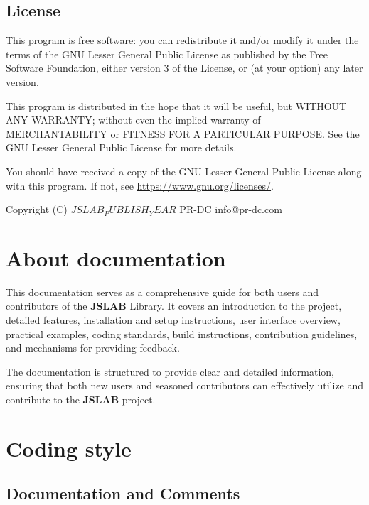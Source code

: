 \documentclass[12pt,a4paper]{article}
\newcommand{\yearvar}{$JSLAB_PUBLISH_YEAR$}
\begin{document}
\subsection{License}
This program is free software: you can redistribute it and/or modify it under the terms of the GNU Lesser General Public License as published by the Free Software Foundation, either version 3 of the License, or (at your option) any later version.

This program is distributed in the hope that it will be useful, but WITHOUT ANY WARRANTY; without even the implied warranty of MERCHANTABILITY or FITNESS FOR A PARTICULAR PURPOSE. See the GNU Lesser General Public License for more details.

You should have received a copy of the GNU Lesser General Public License along with this program. If not, see \url{https://www.gnu.org/licenses/}.

\vspace{5mm}

Copyright (C) \yearvar\; PR-DC info@pr-dc.com

\vspace{8mm}

\section{About documentation}

This documentation serves as a comprehensive guide for both users and contributors of the \textbf{JSLAB} Library. It covers an introduction to the project, detailed features, installation and setup instructions, user interface overview, practical examples, coding standards, build instructions, contribution guidelines, and mechanisms for providing feedback.

The documentation is structured to provide clear and detailed information, ensuring that both new users and seasoned contributors can effectively utilize and contribute to the \textbf{JSLAB} project.

\section{Coding style}
\label{coding-style}

\subsection{Documentation and Comments}
\end{document}
